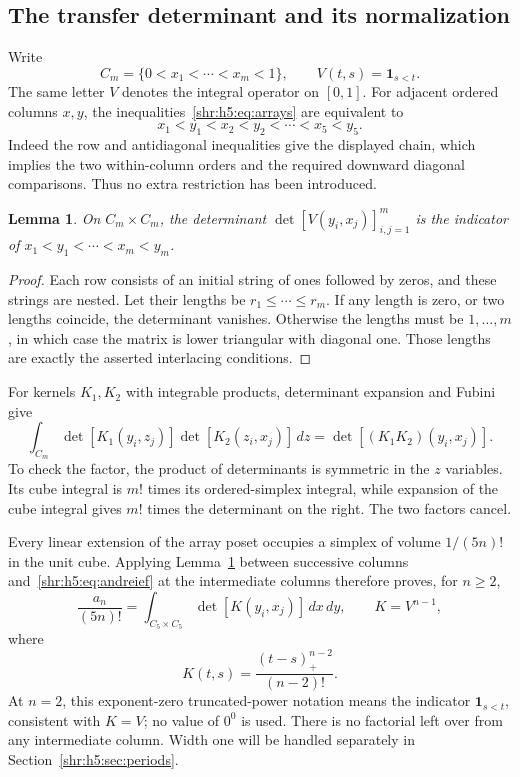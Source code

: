 \documentclass[11pt,letterpaper]{article}
\numberwithin{equation}{section}
\newtheorem{lemma}[theorem]{Lemma}
\theoremstyle{definition}
\newcommand{\1}{\mathbf 1}
\newcommand{\one}{\mathbf1}
\newcommand{\dd}{\,d}
\begin{document}
\subsection{The transfer determinant and its normalization}
Write
\[
 C_m=\{0<x_1<\cdots<x_m<1\},\qquad
 V(t,s)=\one_{s<t}.
\]
The same letter $V$ denotes the integral operator on $[0,1]$.
For adjacent ordered columns $x,y$, the inequalities~\eqref{shr:h5:eq:arrays}
are equivalent to
\begin{equation}
 x_1<y_1<x_2<y_2<\cdots<x_5<y_5.
 \label{shr:h5:eq:interlace}
\end{equation}
Indeed the row and antidiagonal inequalities give the displayed chain,
which implies the two within-column orders and the required downward
diagonal comparisons. Thus no extra restriction has been introduced.

\begin{lemma}\label{shr:h5:lem:indicator}
On $C_m\times C_m$, the determinant
$\det[V(y_i,x_j)]_{i,j=1}^m$ is the indicator of
$x_1<y_1<\cdots<x_m<y_m$.
\end{lemma}
\begin{proof}
Each row consists of an initial string of ones followed by zeros, and
these strings are nested. Let their lengths be $r_1\le\cdots\le r_m$.
If any length is zero, or two lengths coincide, the determinant vanishes.
Otherwise the lengths must be $1,\ldots,m$, in which case the matrix is
lower triangular with diagonal one. Those lengths are exactly the asserted
interlacing conditions.
\end{proof}

For kernels $K_1,K_2$ with integrable products, determinant expansion and
Fubini give
\begin{equation}
 \int_{C_m}\det[K_1(y_i,z_j)]\det[K_2(z_i,x_j)]\dd z
   =\det[(K_1K_2)(y_i,x_j)].
 \label{shr:h5:eq:andreief}
\end{equation}
To check the factor, the product of determinants is symmetric in the
$z$ variables. Its cube integral is $m!$ times its ordered-simplex
integral, while expansion of the cube integral gives $m!$ times the
determinant on the right. The two factors cancel.

Every linear extension of the array poset occupies a simplex of volume
$1/(5n)!$ in the unit cube. Applying Lemma~\ref{shr:h5:lem:indicator} between
successive columns and~\eqref{shr:h5:eq:andreief} at the intermediate columns
therefore proves, for $n\ge2$,
\begin{equation}
 \frac{a_n}{(5n)!}
 =\int_{C_5\times C_5}\det[K(y_i,x_j)]\dd x\dd y,
 \qquad K=V^{n-1},
 \label{shr:h5:eq:transfer}
\end{equation}
where
\[
 K(t,s)=\frac{(t-s)_+^{n-2}}{(n-2)!}.
\]
At $n=2$, this exponent-zero truncated-power notation means the indicator
$\one_{s<t}$, consistent with $K=V$; no value of $0^0$ is used.
There is no factorial left over from any intermediate column. Width one
will be handled separately in Section~\ref{shr:h5:sec:periods}.
\end{document}
